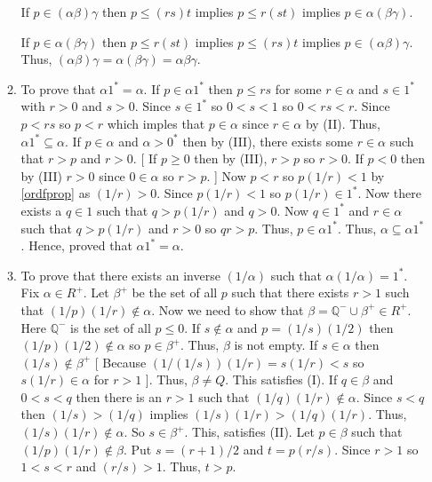\begin{enumerate}[{\bf Step 1.}]
\begin{enumerate}[(M1)]
    If $p \in (\alpha \beta) \gamma$ then $p \leq (rs)t$ implies $p \leq r(st)$ implies $p \in \alpha (\beta \gamma)$.

    If $p \in \alpha (\beta \gamma)$ then $p \leq r(st)$ implies $p \leq (rs)t$ implies $p \in (\alpha \beta) \gamma$.
    \bigbreak 
    Thus, $(\alpha \beta) \gamma = \alpha (\beta \gamma) = \alpha \beta \gamma$.

    \item To prove that $\alpha 1^* = \alpha$.
    \bigbreak \quad
    If $p \in \alpha 1^*$ then $p \leq rs$ for some $r \in \alpha$ and $s \in 1^*$ with $r > 0$ and $s > 0$.
    Since $s \in 1^*$ so $0 < s < 1$ so $0 < rs < r$. 
    Since $p < rs$ so $p < r$ which imples that $p \in \alpha$ since $r \in \alpha$ by (II).
    Thus, $\alpha 1^* \subseteq \alpha$.
    \bigbreak \quad 
    If $p \in \alpha$ and $\alpha > 0^*$ then by (III), there exists some $r \in \alpha$ such that $r > p$ and $r > 0$.
    [ If $p \geq 0$ then by (III), $r > p$ so $r > 0$.
    If $p < 0$ then by (III) $r > 0$ since $0 \in \alpha$ so $r > p$. ]
    \bigbreak \quad
    Now $p < r$ so $p (1/r) < 1$ by \ref{ordfprop} as $(1/r) > 0$.
    Since $p(1/r) < 1$ so $p(1/r) \in 1^*$. 
    Now there exists a $q \in 1$ such that $q > p(1/r)$ and $q > 0$.
    Now $q \in 1^*$ and $r \in \alpha$ such that $q > p(1/r)$ and $r > 0$
    so $qr > p$. Thus, $p \in \alpha 1^*$.
    Thus, $\alpha \subseteq \alpha 1^*$.
    \bigbreak
    Hence, proved that $\alpha 1^* = \alpha$.

    \item To prove that there exists an inverse $(1/\alpha)$ such that $\alpha (1 / \alpha) = 1^*$.
    \bigbreak
    Fix $\alpha \in R^+$. Let $\beta^+$ be the set of all $p$ such that there exists $r > 1$ such that $(1/p)(1/r) \notin \alpha$.
    \bigbreak
    Now we need to show that $\beta = \mathbb{Q}^- \cup \beta^+ \in R^+$. Here $\mathbb{Q}^-$ is the set of all $p \leq 0$.
    \bigbreak \quad
    If $s \notin \alpha$ and $p = (1/s)(1/2)$ then $(1/p)(1/2) \notin \alpha$ so $p \in \beta^+$. Thus, $\beta$ is not empty.
    If $s \in \alpha$ then $(1/s) \notin \beta^+$
    [ Because $(1/(1/s))(1/r) = s(1/r) < s$ so $s(1/r) \in \alpha$ for $r > 1$ ].
    Thus, $\beta \neq Q$.
    This satisfies (I).
    \bigbreak \quad
    If $q \in \beta$ and $0 < s < q$ then there is an $r > 1$ such that $(1/q)(1/r) \notin \alpha$.
    Since $s < q$ then $(1/s) > (1/q)$ implies $(1/s)(1/r) > (1/q)(1/r)$. Thus, $(1/s)(1/r) \notin \alpha$.
    So $s \in \beta^+$. This, satisfies (II).
    \bigbreak \quad
    Let $p \in \beta$ such that $(1/p)(1/r) \notin \beta$.
    Put $s = (r+1)/2$ and $t = p(r/s)$. Since $r > 1$ so $1 < s < r$ and $(r/s) > 1$.
    Thus, $t > p$. 


\end{enumerate}
\end{enumerate}
